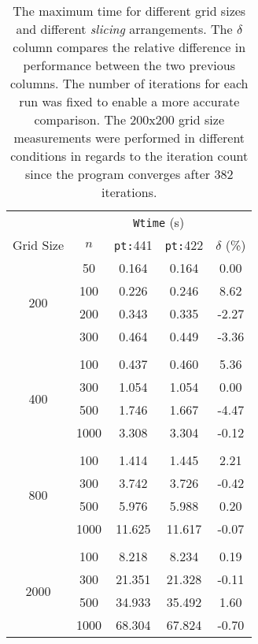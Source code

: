 \begin{table}[H]
\centering
\begin{tabular}{*{5}{c}}
 \toprule
          &     & \multicolumn{2}{c}{\texttt{Wtime} (\si{s})} & \\
Grid Size & $n$ & \texttt{pt:}441 & \texttt{pt:}422           & $\delta$ (\%)\\ \midrule
\multirow{4}{*}{200}
    &    50   &     0.164 &     0.164 &     0.00 \\
    &    100  &     0.226 &     0.246 &     8.62 \\
    &    200  &     0.343 &     0.335 &    -2.27 \\
    &    300  &     0.464 &     0.449 &    -3.36 \\\\
\multirow{4}{*}{400}                                        
    &    100  &     0.437 &     0.460 &     5.36 \\
    &    300  &     1.054 &     1.054 &     0.00 \\
    &    500  &     1.746 &     1.667 &    -4.47 \\
    &    1000 &     3.308 &     3.304 &    -0.12 \\\\
\multirow{4}{*}{800}
    &    100  &     1.414 &     1.445 &     2.21 \\
    &    300  &     3.742 &     3.726 &    -0.42 \\
    &    500  &     5.976 &     5.988 &     0.20 \\
    &    1000 &    11.625 &    11.617 &    -0.07 \\\\
\multirow{4}{*}{2000}
    &    100  &     8.218 &     8.234 &     0.19 \\
    &    300  &    21.351 &    21.328 &    -0.11 \\
    &    500  &    34.933 &    35.492 &     1.60 \\
    &    1000 &    68.304 &    67.824 &    -0.70 \\
\bottomrule
\end{tabular}
\caption{The maximum time for different grid sizes and different \emph{slicing} arrangements. The $\delta$ column compares the relative difference in performance between the two previous columns. The number of iterations for each run was fixed to enable a more accurate comparison. The 200x200 grid size measurements were performed in different conditions in regards to the iteration count since the program converges after 382 iterations.}
\label{tbl:slices}
\end{table}

